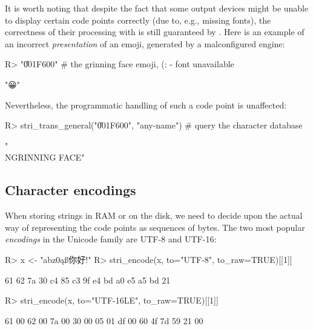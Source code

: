 \documentclass[nojss]{jss}\usepackage[]{graphicx}\usepackage[]{color}
\begin{document}

\bigskip
It is worth noting that despite the fact that some output devices
might be unable to display certain code points correctly
(due to, e.g., missing fonts), the correctness of their
processing with  is still guaranteed by .
Here is an example of an incorrect \textit{presentation} of an emoji,
generated by a malconfigured \XeLaTeX{} engine:

\begin{Schunk}
\begin{Sinput}
R> "\U001F600" # the grinning face emoji, (:               - font unavailable
\end{Sinput}
\begin{Soutput}
[1] "😀"
\end{Soutput}
\end{Schunk}

Nevertheless, the programmatic handling of such a code point is unaffected:

\begin{Schunk}
\begin{Sinput}
R> stri_trans_general("\U001F600", "any-name") # query the character database
\end{Sinput}
\begin{Soutput}
[1] "\\N{GRINNING FACE}"
\end{Soutput}
\end{Schunk}



%
%




\subsection{Character encodings}\label{Sec:encoding}

When storing strings in RAM or on the disk,
we need to decide upon the actual way
of representing the code points as sequences of bytes.
The two most popular \textit{encodings} in the Unicode family are
UTF-8 and UTF-16:

\begin{Schunk}
\begin{Sinput}
R> x <- "abz0ąß你好!"
R> stri_encode(x, to="UTF-8", to_raw=TRUE)[[1]]
\end{Sinput}
\begin{Soutput}
 [1] 61 62 7a 30 c4 85 c3 9f e4 bd a0 e5 a5 bd 21
\end{Soutput}
\begin{Sinput}
R> stri_encode(x, to="UTF-16LE", to_raw=TRUE)[[1]]
\end{Sinput}
\begin{Soutput}
 [1] 61 00 62 00 7a 00 30 00 05 01 df 00 60 4f 7d 59 21 00
\end{Soutput}
\end{Schunk}
\end{document}
